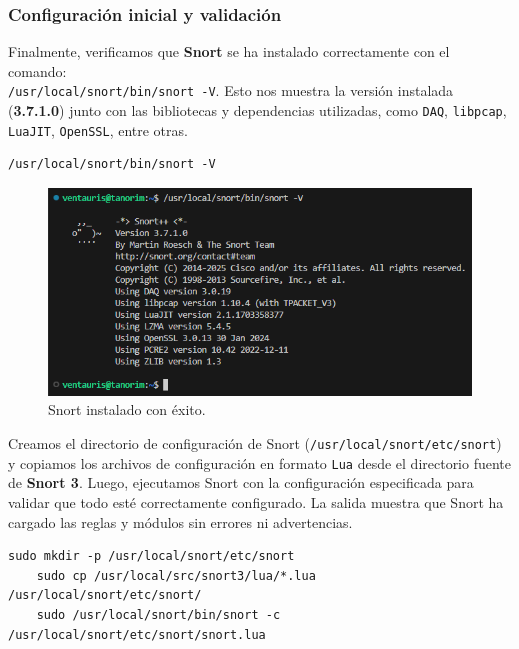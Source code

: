 \documentclass[11pt,a4paper,twoside]{report}
\begin{document}
\subsubsection*{Configuración inicial y validación}

Finalmente, verificamos que \textbf{Snort} se ha instalado correctamente con el comando: \\
\texttt{/usr/local/snort/bin/snort -V}. Esto nos muestra la versión instalada (\textbf{3.7.1.0}) junto con las bibliotecas y dependencias utilizadas, como \texttt{DAQ}, \texttt{libpcap}, \texttt{LuaJIT}, \texttt{OpenSSL}, entre otras.

\begin{lstlisting}[style=commandstyle, caption={Verificando que Snort se haya instalado correctamente}]
	/usr/local/snort/bin/snort -V
\end{lstlisting}

\begin{figure}[H]
	\centering
	\includegraphics[scale=0.5]{instalacion_snort/24.png}
	\caption{Snort instalado con éxito.}
\end{figure}

Creamos el directorio de configuración de Snort (\texttt{/usr/local/snort/etc/snort}) y copiamos los archivos de configuración en formato \texttt{Lua} desde el directorio fuente de \textbf{Snort 3}. Luego, ejecutamos Snort con la configuración especificada para validar que todo esté correctamente configurado. La salida muestra que Snort ha cargado las reglas y módulos sin errores ni advertencias.

\begin{lstlisting}[style=commandstyle, caption={Configuración y validación de Snort}]
	sudo mkdir -p /usr/local/snort/etc/snort
	sudo cp /usr/local/src/snort3/lua/*.lua /usr/local/snort/etc/snort/
	sudo /usr/local/snort/bin/snort -c /usr/local/snort/etc/snort/snort.lua
\end{lstlisting}
\end{document}
